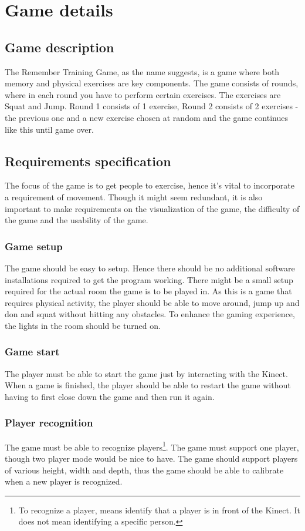 \documentclass[11pt]{report}
\begin{document}
\chapter{Game details}
\section{Game description}
The Remember Training Game, as the name suggests, is a game where both memory and physical exercises are key components. The game consists of rounds, where in each round you have to perform certain exercises. The exercises are Squat and Jump. Round 1 consists of 1 exercise, Round 2 consists of 2 exercises - the previous one and a new exercise chosen at random and the game continues like this until game over.

\section{Requirements specification}
The focus of the game is to get people to exercise, hence it's vital to incorporate a requirement of movement. Though it might seem redundant, it is also important to make requirements on the visualization of the game, the difficulty of the game and the usability of the game.

\subsection{Game setup}
The game should be easy to setup. Hence there should be no additional software installations required to get the program working. There might be a small setup required for the actual room the game is to be played in. As this is a game that requires physical activity, the player should be able to move around, jump up and don and squat without hitting any obstacles. To enhance the gaming experience, the lights in the room should be turned on.

\subsection{Game start}
The player must be able to start the game just by interacting with the Kinect. When a game is finished, the player should be able to restart the game without having to first close down the game and then run it again.

\subsection{Player recognition}
The game must be able to recognize players\footnote{ To recognize a player, means identify that a player is in front of the Kinect. It does not mean identifying a specific person.}. The game must support one player, though two player mode would be nice to have. The game should support players of various height, width and depth, thus the game should be able to calibrate when a new player is recognized.
\end{document}
